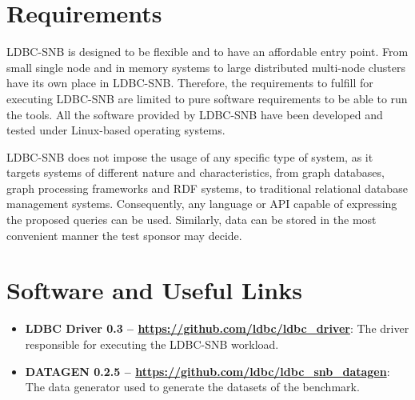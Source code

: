 

\section{Requirements}

LDBC-SNB is designed to be flexible and to have an affordable entry point.
From small single node and in memory systems to large distributed multi-node
clusters have its own place in LDBC-SNB.  Therefore, the requirements to
fulfill for executing LDBC-SNB are limited to pure software requirements to be
able to run the tools. All the software provided by LDBC-SNB have been
developed and tested under Linux-based operating systems.

LDBC-SNB does not impose the usage of any specific type of system, as it
targets systems of different nature and characteristics, from graph databases,
graph processing frameworks and RDF systems, to traditional relational database
management systems. Consequently, any language or API capable of expressing the
proposed queries can be used. Similarly, data can be stored in the most
convenient manner the test sponsor may decide.


\section{Software and Useful Links}

\begin{itemize}
    \item \textbf{LDBC Driver 0.3 -- \url{https://github.com/ldbc/ldbc_driver}}: The driver
    responsible for executing the LDBC-SNB workload.
    \item \textbf{DATAGEN 0.2.5 -- \url{https://github.com/ldbc/ldbc_snb_datagen}}: The data
    generator used to generate the datasets of the benchmark.
\end{itemize}





